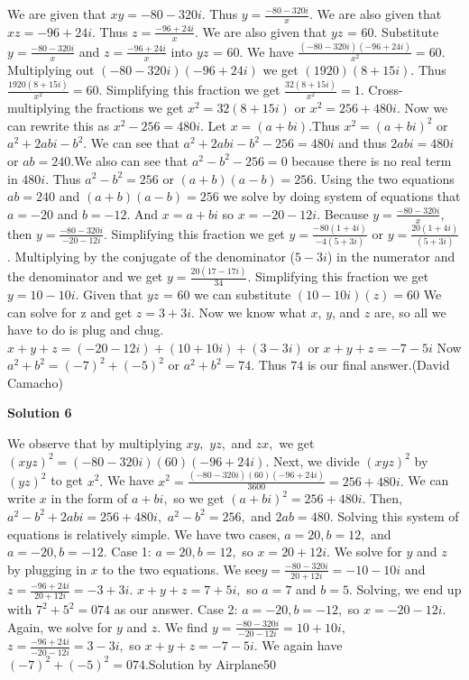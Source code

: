 \begin{enumerate}
We are given that $xy=-80-320i$. Thus $y=\frac{-80-320i}{x}$. We are also given that $xz= -96+24i$. Thus $z=\frac{-96+24i}{x}$. We are also given that $yz$ = $60$. Substitute $y=\frac{-80-320i}{x}$ and $z=\frac{-96+24i}{x}$ into $yz$ = $60$. We have $\frac{(-80-320i)(-96+24i)}{x^2}=60$. Multiplying out $(-80-320i)(-96+24i)$ we get $(1920)(8+15i)$. Thus  $\frac{1920(8+15i)}{x^2} =60$. Simplifying this fraction we get $\frac{32(8+15i)}{x^2}=1$. Cross-multiplying the fractions we get $x^2=32(8+15i)$ or $x^2= 256+480i$. Now we can rewrite this as $x^2-256=480i$. Let $x= (a+bi)$.Thus $x^2=(a+bi)^2$ or $a^2+2abi-b^2$. We can see that $a^2+2abi-b^2-256=480i$ and thus $2abi=480i$ or $ab=240$.We also can see that $a^2-b^2-256=0$ because there is no real term in $480i$. Thus $a^2-b^2=256$ or $(a+b)(a-b)=256$. Using the two equations $ab=240$ and $(a+b)(a-b)=256$ we solve by doing system of equations that $a=-20$ and $b=-12$. And $x=a+bi$ so $x=-20-12i$. Because $y=\frac{-80-320i}{x}$, then $y=\frac{-80-320i}{-20-12i}$. Simplifying this fraction we get $y=\frac{-80(1+4i)}{-4(5+3i)}$ or $y=\frac{20(1+4i)}{(5+3i)}$. Multiplying by the conjugate of the denominator ($5-3i$) in the numerator and the denominator and  we get $y=\frac{20(17-17i)}{34}$. Simplifying this fraction we get $y=10-10i$. Given that $yz$ = $60$ we can substitute $(10-10i)(z)=60$ We can solve for z and get $z=3+3i$. Now we know what $x$, $y$, and $z$ are, so all we have to do is plug and chug. $x+y+z= (-20-12i)+(10+10i)+(3-3i)$ or $x+y+z= -7-5i$ Now $a^2 +b^2=(-7)^2+(-5)^2$ or $a^2 +b^2 = 74$. Thus $74$ is our final answer.(David Camacho)

 



\textbf{Solution 6}

We observe that by multiplying $xy,$ $yz,$ and $zx,$ we get $(xyz)^2=(-80-320i)(60)(-96+24i).$ Next, we divide $(xyz)^2$ by $(yz)^2$ to get $x^2.$ We have $x^2=\frac{(-80-320i)(60)(-96+24i)}{3600}=256+480i.$ We can write $x$ in the form of $a+bi,$ so we get $(a+bi)^2=256+480i.$ Then, $a^2-b^2+2abi=256+480i,$ $a^2-b^2=256,$ and $2ab=480.$ Solving this system of equations is relatively simple. We have two cases, $a=20, b=12,$ and $a=-20, b=-12.$ Case 1: $a=20, b=12,$ so $x=20+12i.$ We solve for $y$ and $z$ by plugging in $x$ to the two equations. We see$y=\frac{-80-320i}{20+12i}=-10-10i$ and $z=\frac{-96+24i}{20+12i}=-3+3i.$ $x+y+z=7+5i,$ so $a=7$ and $b=5.$ Solving, we end up with $7^2+5^2=\boxed{074}$ as our answer. Case 2: $a=-20, b=-12,$ so $x=-20-12i.$ Again, we solve for $y$ and $z.$ We find $y=\frac{-80-320i}{-20-12i}=10+10i,$ $z=\frac{-96+24i}{-20-12i}=3-3i,$ so $x+y+z=-7-5i.$ We again have $(-7)^2+(-5)^2=\boxed{074}.$Solution by Airplane50


\end{enumerate}
